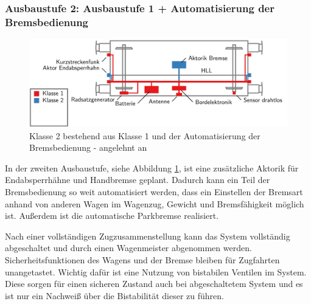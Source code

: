 \subsubsection{Ausbaustufe 2: Ausbaustufe 1 + Automatisierung der Bremsbedienung}
\begin{figure}[htbp] 
    \includegraphics[width=\textwidth]{Bilder/Ausbaustufen_2.PNG}
    \caption{Klasse 2 bestehend aus Klasse 1 und der Automatisierung der Bremsbedienung - angelehnt an \cite{ETR_3}}
    \label{fig:Klasse2}
\end{figure} 
In der zweiten Ausbaustufe, siehe Abbildung \ref{fig:Klasse2}, ist eine zusätzliche Aktorik für Endabsperrhähne und Handbremse geplant. Dadurch kann ein Teil der Bremsbedienung so weit automatisiert werden, dass ein Einstellen der Bremsart anhand von anderen Wagen im Wagenzug, Gewicht und Bremsfähigkeit möglich ist. Außerdem ist die automatische Parkbremse realisiert.\par
Nach einer vollständigen Zugzusammenstellung kann das System vollständig abgeschaltet und durch einen Wagenmeister abgenommen werden. Sicherheitsfunktionen des Wagens und der Bremse bleiben für Zugfahrten unangetastet. Wichtig dafür ist eine Nutzung von bistabilen Ventilen im System. Diese sorgen für einen sicheren Zustand auch bei abgeschaltetem System und es ist nur ein Nachweiß über die Bistabilität dieser zu führen.

